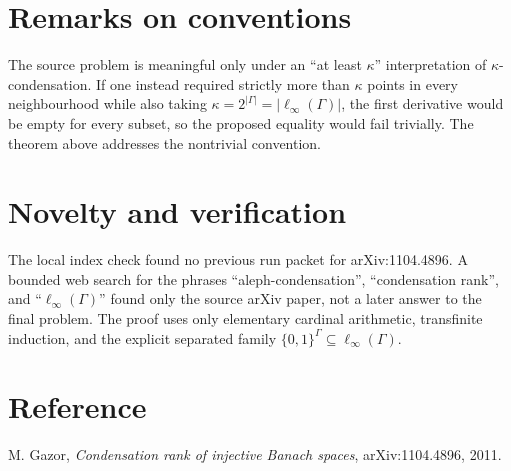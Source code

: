 \documentclass[11pt]{article}
\newcommand{\card}[1]{\left|#1\right|}
\begin{document}
\section*{Remarks on conventions}

The source problem is meaningful only under an ``at least \(\kappa\)''
interpretation of \(\kappa\)-condensation.  If one instead required strictly
more than \(\kappa\) points in every neighbourhood while also taking
\(\kappa=2^{\card{\Gamma}}=\card{\ell_\infty(\Gamma)}\), the first derivative
would be empty for every subset, so the proposed equality would fail
trivially.  The theorem above addresses the nontrivial convention.

\section*{Novelty and verification}

The local index check found no previous run packet for arXiv:1104.4896.  A
bounded web search for the phrases ``aleph-condensation'', ``condensation
rank'', and ``\( \ell_\infty(\Gamma) \)'' found only the source arXiv paper,
not a later answer to the final problem.  The proof uses only elementary
cardinal arithmetic, transfinite induction, and the explicit separated
family \(\{0,1\}^{\Gamma}\subseteq\ell_\infty(\Gamma)\).

\section*{Reference}

M. Gazor, \emph{Condensation rank of injective Banach spaces},
arXiv:1104.4896, 2011.
\end{document}
